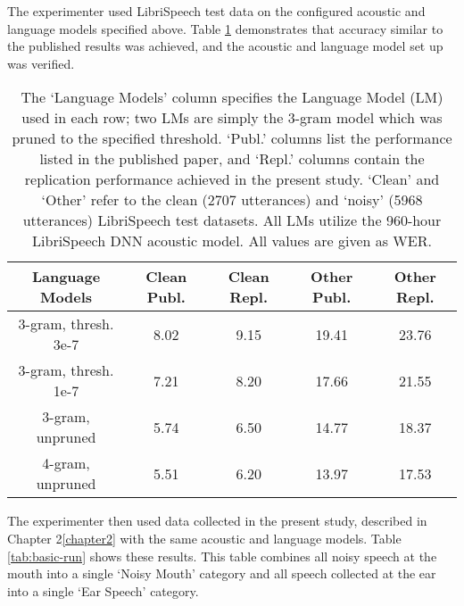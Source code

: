 \documentclass[dissertation,copyright]{uathesis}
\begin{document}
The experimenter used LibriSpeech test data on the configured acoustic and language models specified above.  Table \ref{tab:sanity-check} demonstrates that accuracy similar to the published results was achieved, and the acoustic and language model set up was verified.

\begin{table}[h]
\begin{center}
\begin{tabular}{| c || c | c | c | c |} \hline
Language Models & Clean Publ. & Clean Repl. & Other Publ. & Other Repl. \\ \hline\hline
3-gram, thresh. 3e-7 & 8.02 & 9.15 & 19.41 & 23.76 \\ \hline
3-gram, thresh. 1e-7 & 7.21 & 8.20 & 17.66 & 21.55 \\ \hline
3-gram, unpruned & 5.74 & 6.50 & 14.77 & 18.37 \\ \hline
4-gram, unpruned & 5.51 & 6.20 & 13.97 & 17.53 \\ \hline
\end{tabular}
\end{center}
\caption{The `Language Models' column specifies the Language Model (LM) used in each row; two LMs are simply the 3-gram model which was pruned to the specified threshold.  `Publ.' columns list the performance listed in the published paper, and `Repl.' columns contain the replication performance achieved in the present study.  `Clean' and `Other' refer to the clean (2707 utterances) and `noisy' (5968 utterances) LibriSpeech test datasets. All LMs utilize the 960-hour LibriSpeech DNN acoustic model.  All values are given as WER.}\label{tab:sanity-check}
\end{table}

The experimenter then used data collected in the present study, described in Chapter 2\ref{chapter2} with the same acoustic and language models.  Table \ref{tab:basic-run} shows these results.  This table combines all noisy speech at the mouth into a single `Noisy Mouth' category and all speech collected at the ear into a single `Ear Speech' category.
\end{document}
